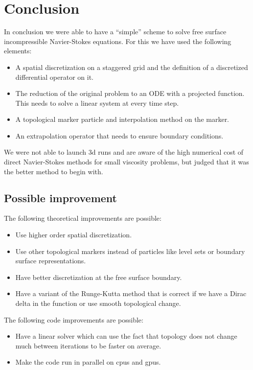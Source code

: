 \chapter{Conclusion}

In conclusion we were able to have a ``simple'' scheme to solve free surface incompressible 
Navier-Stokes equations.
For this we have used the following elements:
\begin{itemize}
 \item A spatial discretization on a staggered grid and the definition of a discretized differential operator on it.
 \item The reduction of the original problem to an ODE with a projected function.
 This needs to solve a linear system at every time step.
 \item A topological marker particle and interpolation method on the marker.
 \item An extrapolation operator that needs to ensure boundary conditions.
\end{itemize}

We were not able to launch 3d runs and are aware of the high numerical cost of direct Navier-Stokes
methods for small viscosity problems, but judged that it was the better method to begin with.

\section{Possible improvement}

The following theoretical improvements are possible:
\begin{itemize}
 \item Use higher order spatial discretization.
 \item Use other topological markers instead of particles like level sets or boundary surface representations.
 \item Have better discretization at the free surface boundary.
 \item Have a variant of the Runge-Kutta method that is correct if we have a Dirac delta in the function 
 or use smooth topological change.
\end{itemize}

The following code improvements are possible:
\begin{itemize}
 \item Have a linear solver which can use the fact that topology does not change much between iterations
 to be faster on average.
 \item Make the code run in parallel on cpus and gpus.
\end{itemize}

